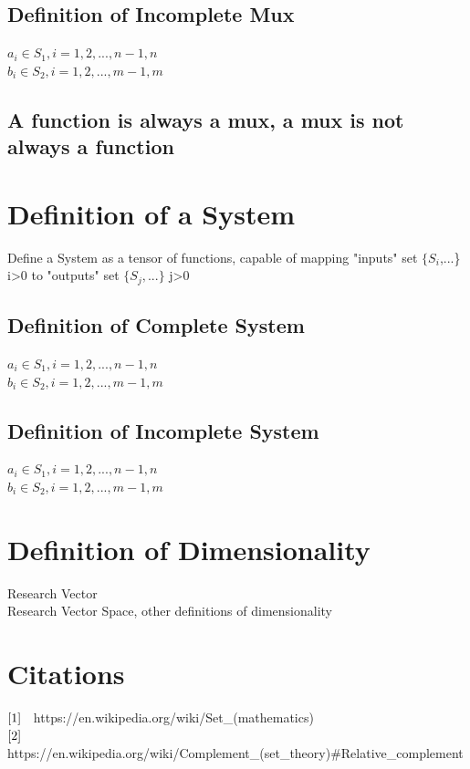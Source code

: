 \documentclass[11pt]{article}
\begin{document}
\subsection{Definition of Incomplete Mux}
\begin{center}
$a_i \in  S_1,  i=1,2,...,n-1,n$\\
$b_i \in  S_2,  i=1,2,...,m-1,m$\\
\end{center}


\subsection{A function is always a mux, a mux is not always a function}







\section{Definition of a System}
Define a System as a tensor of functions, capable of mapping "inputs" set $\{S_{i}$,...\} i>0 to "outputs" set $\{S_j,...\}$ j>0


\subsection{Definition of Complete System}
\begin{center}
$a_i \in  S_1,  i=1,2,...,n-1,n$\\
$b_i \in  S_2,  i=1,2,...,m-1,m$\\
\end{center}


\subsection{Definition of Incomplete System}
\begin{center}
$a_i \in  S_1,  i=1,2,...,n-1,n$\\
$b_i \in  S_2,  i=1,2,...,m-1,m$\\
\end{center}



\section{Definition of Dimensionality}
Research Vector\\
Research Vector Space, other definitions of dimensionality



\section{Citations}
$\lbrack 1 \rbrack \hspace{2mm}$ https://en.wikipedia.org/wiki/Set\_(mathematics)\\
$\lbrack 2 \rbrack \hspace{2mm}$ https://en.wikipedia.org/wiki/Complement\_(set\_theory)\#Relative\_complement
\end{document}
